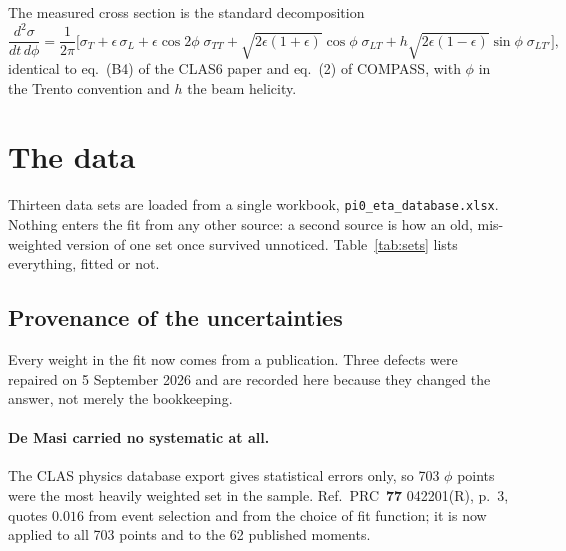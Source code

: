 \documentclass[11pt,a4paper]{article}
\newcommand{\sig}[1]{\sigma_{#1}}
\begin{document}
The measured cross section is the standard decomposition
\begin{equation}
\frac{d^2\sigma}{dt\,d\phi} = \frac{1}{2\pi}\Big[
\sig{T} + \epsilon\,\sig{L}
+ \epsilon\cos 2\phi\; \sig{TT}
+ \sqrt{2\epsilon(1+\epsilon)}\cos\phi\; \sig{LT}
+ h\sqrt{2\epsilon(1-\epsilon)}\sin\phi\; \sig{LT'}\Big],
\label{eq:phidecomp}
\end{equation}
identical to eq.~(B4) of the CLAS6 paper and eq.~(2) of COMPASS, with $\phi$ in
the Trento convention and $h$ the beam helicity.

\section{The data}

Thirteen data sets are loaded from a single workbook,
\texttt{pi0\_eta\_database.xlsx}.  Nothing enters the fit from any other
source: a second source is how an old, mis-weighted version of one set once
survived unnoticed.  Table~\ref{tab:sets} lists everything, fitted or not.

\begin{table}[htb]
\centering\small
\caption{The database and the fit.  A set marked $--$ is not fitted; its
$\chi^2$ is then a blind prediction.  CLAS12 cross sections are preliminary;
the published De Masi $\alpha$ are the same measurement as the $\phi$
distributions and would be double counting.}
\label{tab:sets}

\end{table}

\subsection{Provenance of the uncertainties}

Every weight in the fit now comes from a publication.  Three defects were
repaired on 5 September 2026 and are recorded here because they changed the
answer, not merely the bookkeeping.

\paragraph{De Masi carried no systematic at all.}  The CLAS physics database
export gives statistical errors only, so 703 $\phi$ points were the most
heavily weighted set in the sample.  Ref.~PRC~\textbf{77} 042201(R), p.~3,
quotes $0.016$ from event selection and from the choice of fit function; it is
now applied to all 703 points and to the 62 published moments.
\end{document}
